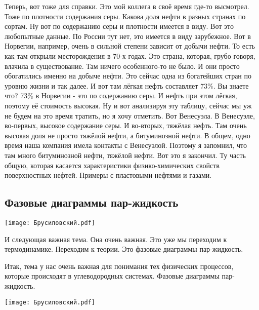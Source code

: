 \documentclass[main.tex]{subfiles}
\begin{document}
Теперь, вот тоже для справки.
Это мой коллега в своё время где-то высмотрел.
Тоже по плотности содержания серы.
Какова доля нефти в разных странах по сортам.
Ну вот по содержанию серы и плотности имеется в виду.
Вот это любопытные данные.
По России тут нет, это имеется в виду зарубежное.
Вот в Норвегии, например, очень в сильной степени зависит от добычи нефти.
То есть как там открыли месторождения в 70-х годах.
Это страна, которая, грубо говоря, влачила в существование.
Там ничего особенного-то не было.
И они просто обогатились именно на добыче нефти.
Это сейчас одна из богатейших стран по уровню жизни и так далее.
И вот там лёгкая нефть составляет 73\%.
Вы знаете что?
73\% в Норвегии - это по содержанию серы.
И нефть при этом лёгкая, поэтому её стоимость высокая.
Ну и вот анализируя эту таблицу, сейчас мы уж не будем на это время тратить, но я хочу отметить.
Вот Венесуэла.
В Венесуэле, во-первых, высокое содержание серы.
И во-вторых, тяжёлая нефть.
Там очень высокая доля не просто тяжёлой нефти, а битуминозной нефти.
В общем, одно время наша компания имела контакты с Венесуэлой.
Поэтому я запомнил, что там много битуминозной нефти, тяжёлой нефти.
Вот это я закончил.
Ту часть общую, которая касается характеристики физико-химических свойств поверхностных нефтей.
Примеры с пластовыми нефтями и газами.

\subsection{Фазовые диаграммы пар-жидкость}

\begin{center}
\texttt{[image: Брусиловский.pdf]}
\end{center}

И следующая важная тема.
Она очень важная.
Это уже мы переходим к термодинамике.
Переходим к теории.
Это фазовые диаграммы пар-жидкость.

Итак, тема у нас очень важная для понимания тех физических процессов, которые происходят в углеводородных системах.
Фазовые диаграммы пар-жидкость.

\begin{center}
\texttt{[image: Брусиловский.pdf]}
\end{center}
\end{document}
